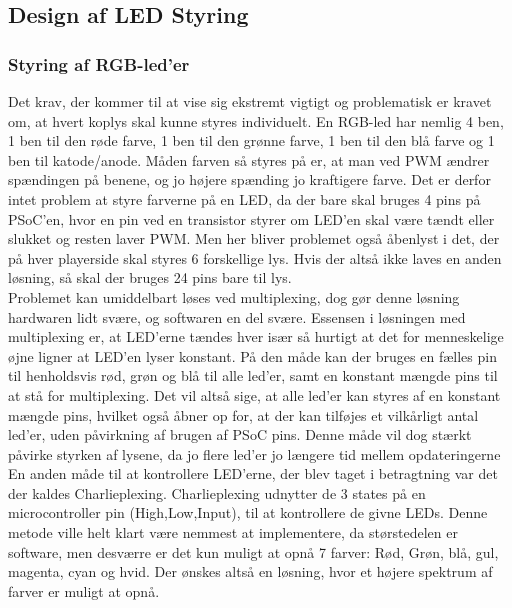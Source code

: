 \documentclass[HardwareDesign/HardwareDesign_main.tex]{subfiles}
\begin{document}
\subsection{Design af LED Styring}
\subsubsection{Styring af RGB-led'er}
Det krav, der kommer til at vise sig ekstremt vigtigt og problematisk er kravet om, at hvert koplys skal kunne styres individuelt. En RGB-led har nemlig 4 ben, 1 ben til den røde farve, 1 ben til den grønne farve, 1 ben til den blå farve og 1 ben til katode/anode. Måden farven så styres på er, at man ved PWM ændrer spændingen på benene, og jo højere spænding jo kraftigere farve. Det er derfor intet problem at styre farverne på en LED, da der bare skal bruges 4 pins på PSoC'en, hvor en pin ved en transistor styrer om LED'en skal være tændt eller slukket og resten laver PWM. Men her bliver problemet også åbenlyst i det, der på hver playerside skal styres 6 forskellige lys. Hvis der altså ikke laves en anden løsning, så skal der bruges 24 pins bare til lys. 
\\Problemet kan umiddelbart løses ved multiplexing, dog gør denne løsning hardwaren lidt svære, og softwaren en del svære. Essensen i løsningen med multiplexing er, at LED'erne tændes hver især så hurtigt at det for menneskelige øjne ligner at LED'en lyser konstant. På den måde kan der bruges en fælles pin til henholdsvis rød, grøn og blå til alle led'er, samt en konstant mængde pins til at stå for multiplexing. Det vil altså sige, at alle led'er kan styres af en konstant mængde pins, hvilket også åbner op for, at der kan tilføjes et vilkårligt antal led'er, uden påvirkning af brugen af PSoC pins. Denne måde vil dog stærkt påvirke styrken af lysene, da jo flere led'er jo længere tid mellem opdateringerne
\\En anden måde til at kontrollere LED'erne, der blev taget i betragtning var det der kaldes Charlieplexing. Charlieplexing udnytter de 3 states på en microcontroller pin (High,Low,Input), til at kontrollere de givne LEDs. Denne metode ville helt klart være nemmest at implementere, da størstedelen er software, men desværre er det kun muligt at opnå 7 farver: Rød, Grøn, blå, gul, magenta, cyan og hvid. Der ønskes altså en løsning, hvor et højere spektrum af farver er muligt at opnå.
\end{document}
